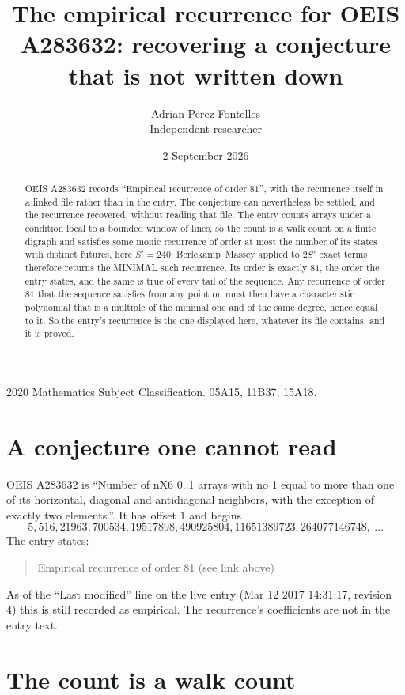\documentclass[11pt,a4paper]{article}
\title{The empirical recurrence for OEIS A283632: recovering a conjecture that is not written down}
\author{Adrian Perez Fontelles\\ \small Independent researcher}
\date{2 September 2026}
\theoremstyle{plain}
\theoremstyle{definition}
\begin{document}
\maketitle

\begin{abstract}
OEIS A283632 records ``Empirical recurrence of order $81$'', with the recurrence itself in a
linked file rather than in the entry. The conjecture can nevertheless be settled, and the
recurrence recovered, without reading that file. The entry counts arrays under a condition
local to a bounded window of lines, so the count is a walk count on a finite digraph and
satisfies some monic recurrence of order at most the number of its states with distinct
futures, here $S'=240$; Berlekamp--Massey applied to $2S'$ exact
terms therefore returns the MINIMAL such recurrence. Its order is exactly $81$, the order
the entry states, and the same is true of every tail of the sequence. Any recurrence of order
$81$ that the sequence satisfies from any point on must then have a characteristic
polynomial that is a multiple of the minimal one and of the same degree, hence equal to it. So
the entry's recurrence is the one displayed here, whatever its file contains, and it is
proved.
\end{abstract}

\noindent\small 2020 Mathematics Subject Classification. 05A15, 11B37, 15A18.\normalsize

\section{A conjecture one cannot read}

OEIS A283632 is ``Number of nX6 0..1 arrays with no 1 equal to more than one of its horizontal, diagonal and antidiagonal neighbors, with the exception of exactly two elements.''. It has offset $1$ and begins
\[
5, 516, 21963, 700534, 19517898, 490925804, 11651389723, 264077146748,\ \dots
\]
The entry states:
\begin{quote}
Empirical recurrence of order 81 (see link above)
\end{quote}
As of the ``Last modified'' line on the live entry (Mar 12 2017 14:31:17, revision 4) this is still
recorded as empirical. The recurrence's coefficients are not in the entry text.

\section{The count is a walk count}
\end{document}
